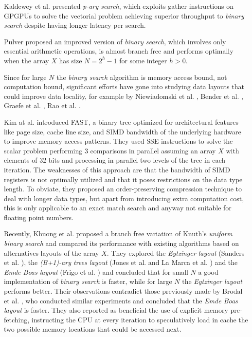 \documentclass[preprint,1p,times]{elsarticle}
\begin{document}
Kaldewey et al. \cite{Kaldewey2009} presented \textit{p-ary search}, which exploits gather instructions on GPGPUs to solve the vectorial problem achieving superior throughput to \textit{binary search} despite having longer latency per search.

Pulver \cite{Pulver2011} proposed an improved version of \textit{binary search}, which involves only essential arithmetic operations, is almost branch free and performs optimally when the array $X$ has size $N=2^h-1$ for some integer $h>0$.

Since for large $N$ the \textit{binary search} algorithm is memory access bound, not computation bound, significant efforts have gone into studying data layouts that could improve data locality, for example by Niewiadomski et al. \cite{Niewiadomski2006}, Bender et al. \cite{Bender2005}, Graefe et al. \cite{Graefe2001}, Rao et al. \cite{Rao1999}. 

Kim at al. \cite{Kim2011} introduced FAST, a binary tree optimized for architectural features like page size, cache line size, and SIMD bandwidth of the underlying hardware to improve memory access patterns. They used SSE instructions to solve the scalar problem performing 3 comparisons in parallel assuming an array $X$ with elements of 32 bits and processing in parallel two levels of the tree in each iteration. The weaknesses of this approach are that the bandwidth of SIMD registers is not optimally utilized and that it poses restrictions on the data type length. To obviate, they proposed an order-preserving compression technique to deal with longer data types, but apart from introducing extra computation cost, this is only applicable to an exact match search and anyway not suitable for floating point numbers.

Recently, Khuong et al. \cite{Morin2015} proposed a branch free variation of Knuth's \textit{uniform binary search} and compared its performance with existing algorithms based on alternatives layouts of the array $X$. They explored the \textit{Eytzinger layout} (Sanders et al. \cite{Sanders2004}), the \textit{(B+1)-ary trees layout} (Jones et al. \cite{Jones1986} and La Marca et al. \cite{LaMarca1996}) and the \textit{Emde Boas layout} (Frigo et al. \cite{Prokop1999}) and concluded that for small $N$ a good implementation of \textit{binary search} is faster, while for large $N$ the \textit{Eytzinger layout} performs better. Their observations contradict those previously made by Brodal et al. \cite{Brodal2002}, who conducted similar experiments and concluded that the \textit{Emde Boas layout} is faster. They also reported as beneficial the use of explicit memory pre-fetching, instructing the CPU at every iteration to speculatively load in cache the two possible memory locations that could be accessed next.
\end{document}
